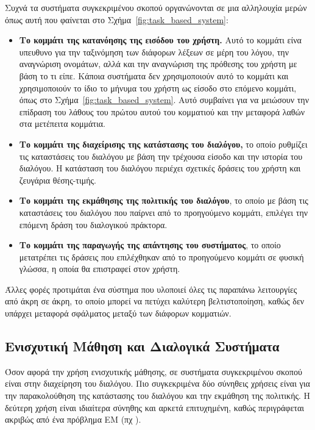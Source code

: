 Συχνά τα συστήματα συγκεκριμένου σκοπού οργανώνονται σε μια αλληλουχία μερών όπως αυτή που φαίνεται στο Σχήμα~\ref{fig:task_based_system}:
\begin{itemize}
    \item \textbf{Το κομμάτι της κατανόησης της εισόδου του χρήστη.} Αυτό το κομμάτι είνα υπευθυνο για την ταξινόμηση των διάφορων λέξεων σε μέρη του λόγου, την αναγνώριση ονομάτων, αλλά και την αναγνώριση της πρόθεσης του χρήστη με βάση το τι είπε. Κάποια συστήματα δεν χρησιμοποιούν αυτό το κομμάτι και χρησιμοποιούν το ίδιο το μήνυμα του χρήστη ως είσοδο στο επόμενο κομμάτι, όπως στο Σχήμα~\ref{fig:task_based_system}. Αυτό συμβαίνει για να μειώσουν την επίδραση του λάθους του πρώτου αυτού του κομματιού και την μεταφορά λαθών στα μετέπειτα κομμάτια. 
    \item \textbf{Το κομμάτι της διαχείρισης της κατάστασης του διαλόγου,} το οποίο ρυθμίζει τις καταστάσεις του διαλόγου με βάση την τρέχουσα είσοδο και την ιστορία του διαλόγου. Η κατάσταση του διαλόγου περιέχει σχετικές δράσεις του χρήστη και ζευγάρια θέσης-τιμής. 
    \item \textbf{Το κομμάτι της εκμάθησης της πολιτικής του διαλόγου}, το οποίο με βάση τις καταστάσεις του διαλόγου που παίρνει από το προηγούμενο κομμάτι, επιλέγει την επόμενη δράση του διαλογικού πράκτορα.
    \item \textbf{Το κομμάτι της παραγωγής της απάντησης του συστήματος}, το οποίο μετατρέπει τις δράσεις που επιλέχθηκαν από το προηγούμενο κομμάτι σε φυσική γλώσσα, η οποία θα επιστραφεί στον χρήστη. 
\end{itemize}

Άλλες φορές προτιμάται ένα σύστημα που υλοποιεί όλες τις παραπάνω λειτουργίες από άκρη σε άκρη, το οποίο μπορεί να πετύχει καλύτερη βελτιστοποίηση, καθώς δεν υπάρχει μεταφορά σφάλματος μεταξύ των διάφορων κομματιών.

\subsection{Ενισχυτική Μάθηση και Διαλογικά Συστήματα}

Όσον αφορά την χρήση ενισχυτικής μάθησης, σε συστήματα συγκεκριμένου σκοπού είναι στην διαχείρηση του διαλόγου. Πιο συγκεκριμένα δύο σύνηθεις χρήσεις είναι για την παρακολούθηση της κατάστασης του διαλόγου και την εκμάθηση της πολιτικής. Η δεύτερη χρήση είναι ιδιαίτερα σύνηθης και αρκετά επιτυχημένη, καθώς περιγράφεται ακριβώς από ένα πρόβλημα ΕΜ (πχ \cite{policy_learning_2019}). 

